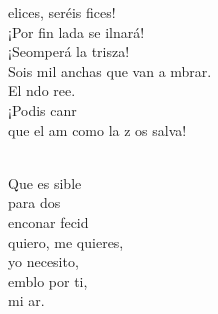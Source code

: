 \documentclass[12pt]{article}
\begin{document}
\begin{multicols*}{2}
\begin{cancion}
	\begin{chorus}%
	elices, seréis fices!\\
	¡Por fin lada se ilnará!\\
	¡Seomperá la trisza!\\
	Sois mil anchas que van a mbrar.\\
	El ndo ree.\\
	¡Podis canr\\
	que el am como la z os salva!\\
	\end{chorus}%
	\jump\\
	Que es sible\\
	para dos \\
	enconar fecid\\
	quiero, me quieres,\\
	yo  necesito,\\
	emblo por ti,\\
	mi ar.\\
\end{cancion}%


\end{multicols*}
\end{document}
